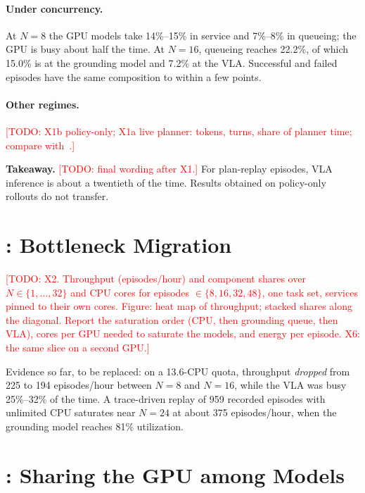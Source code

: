 \documentclass[conference,10pt]{IEEEtran}
\newcommand{\pct}[1]{#1\%}
\newcommand{\num}[1]{#1}                        %
\newcommand{\todo}[1]{\textcolor{red}{[TODO: #1]}}
\begin{document}
\paragraph{Under concurrency.} At $N{=}8$ the GPU models take \pct{14}--\pct{15} in service
and \pct{7}--\pct{8} in queueing; the GPU is busy about half the time. At $N{=}16$, queueing
reaches \pct{\num{22.2}}, of which \pct{\num{15.0}} is at the grounding model and
\pct{\num{7.2}} at the VLA. Successful and failed episodes have the same composition to
within a few points.

\paragraph{Other regimes.} \todo{X1b policy-only; X1a live planner: tokens, turns, share of
planner time; compare with~\cite{wan2025ispass}.}

\textbf{Takeaway.} \todo{final wording after X1.} For plan-replay episodes, VLA inference is
about a twentieth of the time. Results obtained on policy-only rollouts do not transfer.

\section{\rqb: Bottleneck Migration}\label{sec:scaling}

\todo{X2. Throughput (episodes/hour) and component shares over $N \in \{1,\dots,32\}$ and
CPU cores for episodes $\in \{8,16,32,48\}$, one task set, services pinned to their own
cores. Figure: heat map of throughput; stacked shares along the diagonal. Report the
saturation order (CPU, then grounding queue, then VLA), cores per GPU needed to saturate the
models, and energy per episode. X6: the same slice on a second GPU.}

Evidence so far, to be replaced: on a 13.6-CPU quota, throughput \emph{dropped} from 225 to
194 episodes/hour between $N{=}8$ and $N{=}16$, while the VLA was busy \pct{25}--\pct{32} of
the time. A trace-driven replay of 959 recorded episodes with unlimited CPU saturates near
$N{=}24$ at about 375 episodes/hour, when the grounding model reaches \pct{81} utilization.

\section{\rqc: Sharing the GPU among Models}\label{sec:sharing}
\end{document}
